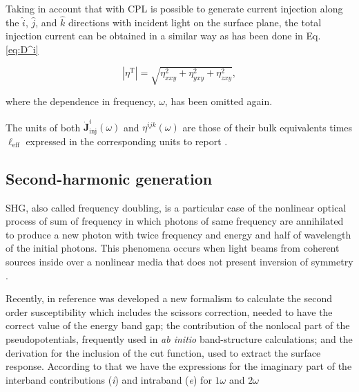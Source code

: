 \documentclass[pss]{wiley2sp} %
\begin{document}
Taking in account that with CPL is possible to generate current injection
along the $\hat{i}$, $\hat{j}$, and $\hat{k}$ directions with incident light on
the surface plane, the total injection current can be obtained in a similar way
as has been done in Eq. \ref{eq:D^i}

\begin{equation}
    \left|{\eta^{\text{T}}}\right| = \sqrt{ \eta_{xxy}^{2} +
    \eta_{yxy}^{2} + \eta_{zxy}^{2} },
\end{equation}

\noindent where the dependence in frequency, $\omega$, has been omitted again.

The units of both $\mathbf{\dot{J}}^{i}_{\text{inj}}(\omega)$ and $\eta^{ijk}
(\omega)$  are those of their bulk equivalents times $\ell_{\text{eff}}$
expressed in the corresponding units to report \cite{cabellos2011optical}.


\subsection{Second-harmonic generation}

SHG, also called frequency doubling, is a particular case of the nonlinear optical process of sum of frequency in which photons of same frequency are annihilated to produce a new photon with twice frequency and energy and half of wavelength of the initial photons. This phenomena occurs when light beams from coherent sources inside over a nonlinear media that does not present inversion of symmetry \cite{bloembergen1962light,anderson2015theory,salazar2014molecular,sipe2000second}.

Recently, in reference \cite{anderson2015theory} was developed a new formalism to calculate the second order susceptibility which includes the scissors correction, needed to have the correct value of the energy band gap; the contribution of the nonlocal part of the pseudopotentials, frequently used in \emph{ab initio} band-structure calculations; and the derivation for the inclusion of the cut function, used to extract the surface response. According to that we have the expressions for the imaginary part of the interband contributions (\emph{i}) and intraband (\emph{e}) for $1\omega$ and $2\omega$
\end{document}
